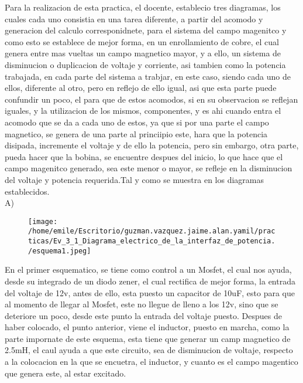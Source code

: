 \documentclass[11pt]{article}
\begin{document}
Para la realizacion de esta practica, el docente, establecio tres diagramas, los cuales cada uno consistia en una tarea diferente, a partir del acomodo y generacion del calculo corresponidnete, para el sistema del campo magenitco y como esto se establece de mejor forma, en un enrollamiento de cobre, el cual genera entre mas vueltas un campo magnetico mayor, y a ello, un sistema de disminucion o duplicacion de voltaje y corriente, asi tambien como la potencia trabajada, en cada parte del sistema a trabjar, en este caso, siendo cada uno de ellos, diferente al otro, pero en reflejo de ello igual, asi que esta parte puede confundir un poco, el para que de estos acomodos, si en su observacion se reflejan iguales, y la utilizacion de los mismos, componentes, y es ahi cuando entra el acomodo que se da a cada uno de estos, ya que si por una parte el campo magnetico, se genera de una parte al princiipio este, hara que la potencia disipada, incremente el voltaje y de ello la potencia, pero sin embargo, otra parte, pueda hacer que la bobina, se encuentre despues del inicio, lo que hace que el campo magenitco generado, sea este menor o mayor, se refleje en la disminucion del voltaje y potencia requerida.Tal y como se muestra en los diagramas establecidos.\\

A)\\

\begin{figure}[htp]
\centering
\texttt{[image: /home/emile/Escritorio/guzman.vazquez.jaime.alan.yamil/practicas/Ev\_3\_1\_Diagrama\_electrico\_de\_la\_interfaz\_de\_potencia./esquema1.jpeg]}
\caption{}
\label{}
\end{figure}

En el primer esquematico, se tiene como control a un Mosfet, el cual nos ayuda, desde su integrado de un diodo zener, el cual rectifica de mejor forma, la entrada del voltaje de 12v, antes de ello, esta puesto un capacitor de 10uF, esto para que al momento de llegar al Mosfet, este no llegue de lleno a los 12v, sino que se deteriore un poco, desde este punto la entrada del voltaje puesto. Despues de haber colocado, el punto anterior, viene el inductor, puesto en marcha, como la parte impornate de este esquema, esta tiene que generar un camp magnetico de 2.5mH, el caul ayuda a que este circuito, sea de disminucion de voltaje, respecto a la colocacion en la que se encuetra, el inductor, y cuanto es el campo magentico que genera este, al estar excitado.\\
\end{document}
